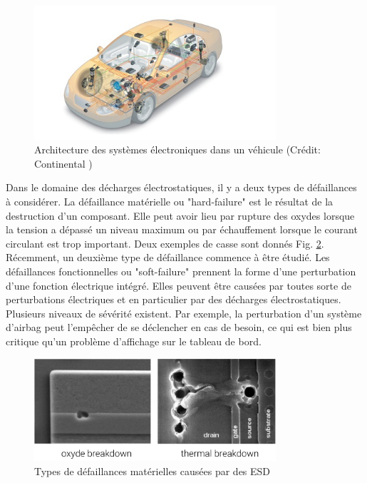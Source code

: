 \begin{figure}[!h]
  \centering
  \includegraphics[width=0.8\textwidth]{src/1/figures/systemintegration_01_uv-data.jpg}
  \caption{Architecture des systèmes électroniques dans un véhicule (Crédit: Continental \cite{car-architecture})}
  \label{fig:car-architecture}
\end{figure}

Dans le domaine des décharges électrostatiques, il y a deux types de défaillances à considérer.
La défaillance matérielle ou "hard-failure" est le résultat de la destruction d'un composant.
Elle peut avoir lieu par rupture des oxydes lorsque la tension a dépassé un niveau maximum ou par échauffement lorsque le courant circulant est trop important.
Deux exemples de casse sont donnés Fig. \ref{fig:esd-failures}.
Récemment, un deuxième type de défaillance commence à être étudié.
Les défaillances fonctionnelles ou "soft-failure" prennent la forme d'une perturbation d'une fonction électrique intégré.
Elles peuvent être causées par toutes sorte de perturbations électriques et en particulier par des décharges électrostatiques.
Plusieurs niveaux de sévérité existent.
Par exemple, la perturbation d'un système d'airbag peut l'empêcher de se déclencher en cas de besoin, ce qui est bien plus critique qu'un problème d'affichage sur le tableau de bord.

\begin{figure}[!h]
  \centering
  \includegraphics[width=0.8\textwidth]{src/1/figures/esd_failures.pdf}
  \caption{Types de défaillances matérielles causées par des ESD}
  \label{fig:esd-failures}
\end{figure}

